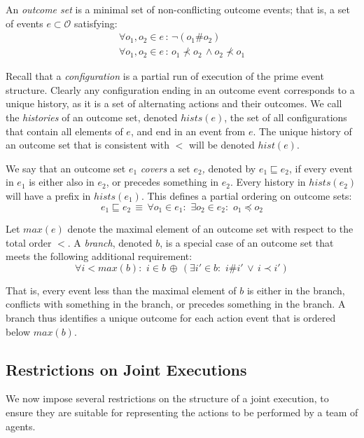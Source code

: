 An \emph{outcome set} is a minimal set of non-conflicting outcome
events; that is, a set of events $e\subset\mathcal{O}$ satisfying:\begin{gather*}
\forall o_{1},o_{2}\in e\,:\,\neg(o_{1}\#o_{2})\\
\forall o_{1},o_{2}\in e\,:\, o_{1}\not\prec o_{2}\,\wedge o_{2}\not\prec o_{1}\end{gather*}


Recall that a \emph{configuration} is a partial run of execution of
the prime event structure. Clearly any configuration ending in an
outcome event corresponds to a unique history, as it is a set of alternating
actions and their outcomes. We call the \emph{histories} of an outcome
set, denoted $hists(e)$, the set of all configurations that contain
all elements of $e$, and end in an event from $e$. The unique history
of an outcome set that is consistent with $<$ will be denoted $hist(e)$.

We say that an outcome set $e_{1}$ \emph{covers} a set \emph{$e_{2}$,}
denoted by $e_{1}\sqsubseteq e_{2}$, if every event in $e_{1}$ is
either also in $e_{2}$, or precedes something in $e_{2}$. Every
history in $hists(e_{2})$ will have a prefix in $hists(e_{1})$.
This defines a partial ordering on outcome sets:\[
e_{1}\sqsubseteq e_{2}\,\equiv\,\forall o_{1}\in e_{1}:\,\,\exists o_{2}\in e_{2}:\,\, o_{1}\preceq o_{2}\]


Let $max(e)$ denote the maximal element of an outcome set with respect
to the total order $<$. A \emph{branch}, denoted $b$, is a special
case of an outcome set that meets the following additional requirement:\[
\forall i<max(b):\,\, i\in b\,\oplus\,(\exists i'\in b:\,\, i\#i'\,\vee\, i\prec i')\]


That is, every event less than the maximal element of $b$ is either
in the branch, conflicts with something in the branch, or precedes
something in the branch. A branch thus identifies a unique outcome
for each action event that is ordered below $max(b)$.


\subsection{Restrictions on Joint Executions}

\label{sub:Restrictions}

We now impose several restrictions on the structure of a joint execution,
to ensure they are suitable for representing the actions to be performed
by a team of agents.\\


